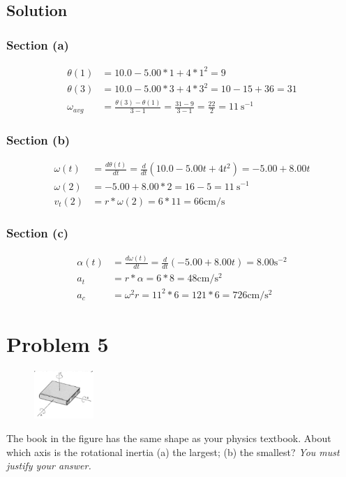 \documentclass[12pt]{article}
\begin{document}
\subsection*{Solution}
\subsubsection*{Section (a)}
\begin{align*}
    \theta(1)   &=  10.0 - 5.00 * 1 + 4 * 1^2
        =   9\\
    \theta(3)   &=  10.0 - 5.00 * 3 + 4 * 3^2
        =   10 - 15 + 36
        =   31\\
    \omega_{avg}    &=  \frac{\theta(3) - \theta(1)}{3 - 1}
        =   \frac{31 - 9}{3 - 1}
        =   \frac{22}{2}
        =   \boxed{11\ \unit{\second^{-1}}}
\end{align*}

\subsubsection*{Section (b)}
\begin{align*}
    \omega(t)   &=  \frac{d\theta(t)}{dt}
        =   \frac{d}{dt}\left(10.0 - 5.00 t + 4 t^2\right)
        =   -5.00 + 8.00 t\\
    \omega(2)   &=  -5.00 + 8.00 * 2
        =   16 - 5
        =   11\ \unit{\second^{-1}}\\
    v_t(2)  &=  r*\omega(2)
        =   6*11
        =   \boxed{66\unit{\centi\meter/\second}}
\end{align*}

\subsubsection*{Section (c)}
\begin{align*}
    \alpha(t)   &=  \frac{d\omega(t)}{dt}
        =   \frac{d}{dt}\left(-5.00 + 8.00 t\right)
        =   8.00    \unit{\second^{-2}}\\
    a_t &=  r*\alpha
        =   6*8
        =   \boxed{48\unit{\centi\meter/\second^2}}\\
    a_c &=  \omega^2 r
        =   11^2*6
        =   121*6
        =   \boxed{726\unit{\centi\meter/\second^2}}
\end{align*}


\pagebreak
\section*{Problem 5}
\begin{figure}
    \vspace{-30pt}
    \includegraphics[width=0.20\textwidth]{graph_5.png} 
\end{figure}
The book in the figure has the same shape as your physics textbook. About which axis is the
rotational inertia (a) the largest; (b) the smallest? \textit{You must justify your answer.}
\end{document}
